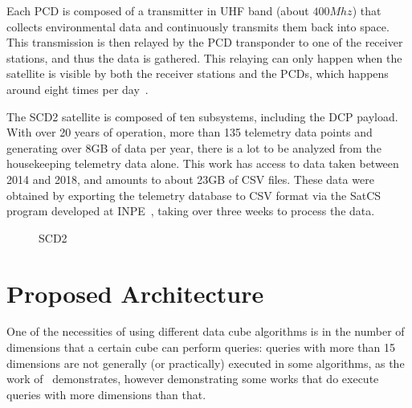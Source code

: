Each PCD is composed of a transmitter in UHF band (about $400Mhz$) that collects environmental data and continuously transmits them back into space.
This transmission is then relayed by the PCD transponder to one of the receiver stations, and thus the data is gathered.
This relaying can only happen when the satellite is visible by both the receiver stations and the PCDs, which happens around eight times per day~\cite{miguezSCD2OperationHandbook1993}.

The SCD2 satellite is composed of ten subsystems, including the DCP payload.
With over 20 years of operation, more than 135 telemetry data points and generating over 8GB of data per year, there is a lot to be analyzed from the housekeeping telemetry data alone.
This work has access to data taken between 2014 and 2018, and amounts to about 23GB of CSV files.
These data were obtained by exporting the telemetry database to CSV format via the SatCS program developed at INPE~\cite{azevedoFRAMEWORKSISTEMACONTROLE2015}, taking over three weeks to process the data.

\begin{figure}[H]
  \caption{SCD2}\label{fig:scd2_mission}
  \vspace{6mm}
  \begin{center}
  \end{center}
  \vspace{2mm}
\end{figure}

\section{Proposed Architecture}\label{ch:prop:static}

One of the necessities of using different data cube algorithms is in the number of dimensions that a certain cube can perform queries: queries with more than 15 dimensions are not generally (or practically) executed in some algorithms, as the work of~\cite{silvaComputingBIGData2016} demonstrates, however demonstrating some works that do execute queries with more dimensions than that.

